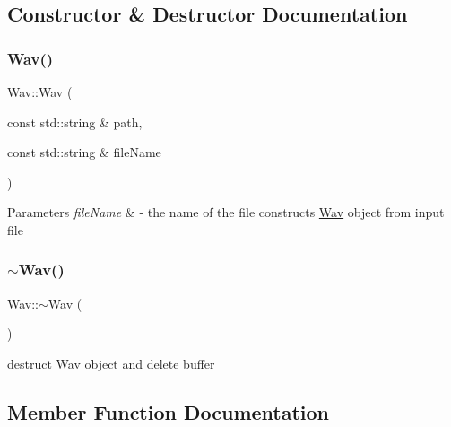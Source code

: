 \subsection{Constructor \& Destructor Documentation}
\mbox{\label{classWav_a573605770be554fbf416e72e0f9109fe}} 
\subsubsection{\texorpdfstring{Wav()}{Wav()}}
{\footnotesize\ttfamily Wav\+::\+Wav (\begin{DoxyParamCaption}\item[{const std\+::string \&}]{path,  }\item[{const std\+::string \&}]{file\+Name }\end{DoxyParamCaption})}


\begin{DoxyParams}{Parameters}
{\em file\+Name} & -\/ the name of the file constructs \hyperlink{classWav}{Wav} object from input file \\
\hline
\end{DoxyParams}
\mbox{\label{classWav_a1510b246ba121b103a60b8e7839af25f}} 
\subsubsection{\texorpdfstring{$\sim$\+Wav()}{~Wav()}}
{\footnotesize\ttfamily Wav\+::$\sim$\+Wav (\begin{DoxyParamCaption}{ }\end{DoxyParamCaption})\hspace{0.3cm}{\ttfamily [virtual]}}


\begin{DoxyItemize}
\item destruct \hyperlink{classWav}{Wav} object and delete buffer 
\end{DoxyItemize}

\subsection{Member Function Documentation}
\mbox{\label{classWav_af3aaf1636defa1288d866725e39c7f69}} 
